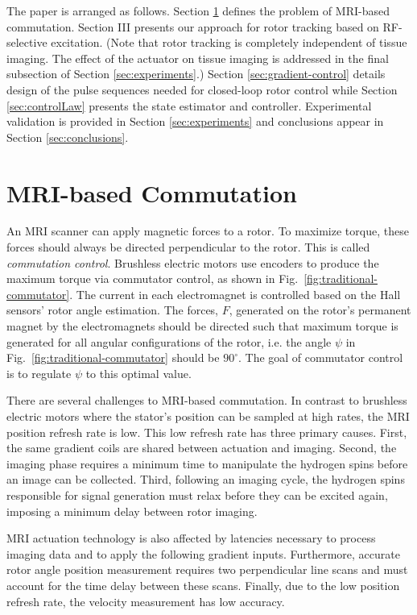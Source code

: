 \documentclass[journal]{IEEEtran}
\begin{document}
The paper is arranged as follows. Section \ref{sec:actuator-technology} defines the problem of MRI-based commutation. Section III presents our approach for rotor tracking based on RF-selective excitation. (Note that rotor tracking is completely independent of tissue imaging. The effect of the actuator on tissue imaging is addressed in the final subsection of Section \ref{sec:experiments}.) Section \ref{sec:gradient-control} details design of the pulse sequences needed for closed-loop rotor control while Section \ref{sec:controlLaw} presents the state estimator and controller.
Experimental validation is provided in Section \ref{sec:experiments} and conclusions appear in Section \ref{sec:conclusions}.  


\section{MRI-based Commutation}
\label{sec:actuator-technology}

An MRI scanner can apply magnetic forces to a rotor.  To maximize torque, these forces should always be directed perpendicular to the rotor. This is called \emph{commutation control}. Brushless electric motors use encoders to produce the maximum torque via commutator control, as shown in Fig.\ \ref{fig:traditional-commutator}. The current in each electromagnet is controlled based on the Hall sensors' rotor angle estimation. The forces, $F$, generated on the rotor's permanent magnet by the electromagnets should be directed such that maximum torque is generated for all angular configurations of the rotor, i.e. the angle $\psi$ in Fig.\ \ref{fig:traditional-commutator} should be $90^\circ$. The goal of commutator control is to regulate $\psi$ to this optimal value. 

There are several challenges to MRI-based commutation. In contrast to brushless electric motors where the stator's position can be sampled at high rates, the MRI position refresh rate is low. This low refresh rate has three primary causes. First, the same gradient coils are shared between actuation and imaging. Second, the imaging phase requires a minimum time to manipulate the hydrogen spins before an image can be collected. Third, following an imaging cycle, the hydrogen spins responsible for signal generation must relax before they can be excited again, imposing a minimum delay between rotor imaging. 

MRI actuation technology is also affected by latencies necessary to process imaging data and to apply the following gradient inputs. Furthermore, accurate rotor angle position measurement requires two perpendicular line scans and must account for the time delay between these scans. Finally, 
due to the low position refresh rate, the velocity measurement has low accuracy. 
\end{document}
